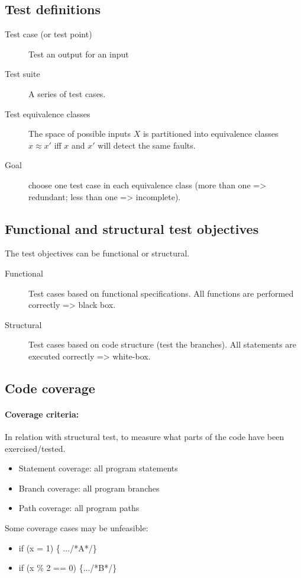 \subsection{Test definitions}

\begin{description}
    \item[Test case (or test point)] Test an output for an input
    \item[Test suite] A series of test cases.
    \item[Test equivalence classes] The space of possible inputs $X$ is partitioned into equivalence classes $x \approx x'$ iff $x$ and $x'$ will detect the same faults.
    \item[Goal] choose one test case in each equivalence class (more than one => redundant; less than one => incomplete).
\end{description}

\subsection{Functional and structural test objectives}
The test objectives can be functional or structural. \newline

\begin{description}
    \item[Functional] Test cases based on functional specifications.
        \subitem{} All functions are performed correctly => black box.
    \item[Structural] Test cases based on code structure (test the branches).
        \subitem{} All statements are executed correctly => white-box.
\end{description}


\subsection{Code coverage}

\paragraph{Coverage criteria:}
In relation with structural test, to measure what parts of the code have been
exercised/tested.

\begin{itemize}
    \item Statement coverage: all program statements
    \item Branch coverage: all program branches
    \item Path coverage: all program paths
\end{itemize}
Some coverage cases may be unfeasible:
\begin{itemize}
	\item if (x = 1) \{ .../*A*/\}
	\item if (x \% 2 == 0) \{.../*B*/\}
\end{itemize}


